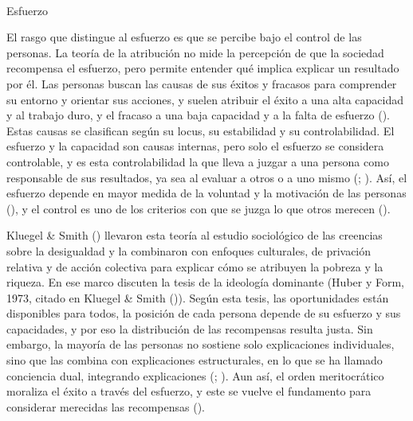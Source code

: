 \documentclass[
  spanish,
  a4paper,
  oneside]{scrbook}
\makeatletter
\let\oldparagraph\paragraph
\renewcommand{\paragraph}{
    \@ifstar
      \xxxParagraphStar
      \xxxParagraphNoStar
  }
\newcommand{\xxxParagraphStar}[1]{\oldparagraph*{#1}\mbox{}}
\newcommand{\xxxParagraphNoStar}[1]{\oldparagraph{#1}\mbox{}}
\makeatother
\begin{document}
\paragraph{Esfuerzo}\label{esfuerzo-1}

El rasgo que distingue al esfuerzo es que se percibe bajo el control de
las personas. La teoría de la atribución no mide la percepción de que la
sociedad recompensa el esfuerzo, pero permite entender qué implica
explicar un resultado por él. Las personas buscan las causas de sus
éxitos y fracasos para comprender su entorno y orientar sus acciones, y
suelen atribuir el éxito a una alta capacidad y al trabajo duro, y el
fracaso a una baja capacidad y a la falta de esfuerzo
(). Estas causas
se clasifican según su locus, su estabilidad y su controlabilidad. El
esfuerzo y la capacidad son causas internas, pero solo el esfuerzo se
considera controlable, y es esta controlabilidad la que lleva a juzgar a
una persona como responsable de sus resultados, ya sea al evaluar a
otros o a uno mismo (; ). Así, el esfuerzo depende en mayor medida de la voluntad y la
motivación de las personas
(),
y el control es uno de los criterios con que se juzga lo que otros
merecen ().

Kluegel \& Smith () llevaron
esta teoría al estudio sociológico de las creencias sobre la desigualdad
y la combinaron con enfoques culturales, de privación relativa y de
acción colectiva para explicar cómo se atribuyen la pobreza y la
riqueza. En ese marco discuten la tesis de la ideología dominante (Huber
y Form, 1973, citado en Kluegel \& Smith
()). Según esta tesis, las
oportunidades están disponibles para todos, la posición de cada persona
depende de su esfuerzo y sus capacidades, y por eso la distribución de
las recompensas resulta justa. Sin embargo, la mayoría de las personas
no sostiene solo explicaciones individuales, sino que las combina con
explicaciones estructurales, en lo que se ha llamado conciencia dual,
integrando explicaciones
(;
). Aun así, el orden
meritocrático moraliza el éxito a través del esfuerzo, y este se vuelve
el fundamento para considerar merecidas las recompensas
().
\end{document}
